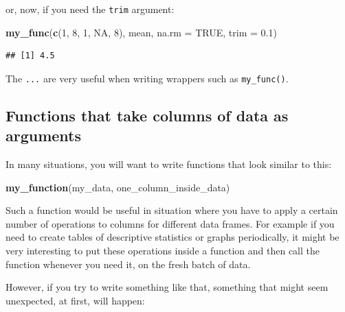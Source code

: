 \documentclass[]{gitbook}
\newenvironment{Shaded}{\begin{snugshade}}{\end{snugshade}}
\newcommand{\ControlFlowTok}[1]{\textcolor[rgb]{0.13,0.29,0.53}{\textbf{#1}}}
\newcommand{\DataTypeTok}[1]{\textcolor[rgb]{0.13,0.29,0.53}{#1}}
\newcommand{\DecValTok}[1]{\textcolor[rgb]{0.00,0.00,0.81}{#1}}
\newcommand{\FloatTok}[1]{\textcolor[rgb]{0.00,0.00,0.81}{#1}}
\newcommand{\KeywordTok}[1]{\textcolor[rgb]{0.13,0.29,0.53}{\textbf{#1}}}
\newcommand{\NormalTok}[1]{#1}
\newcommand{\OperatorTok}[1]{\textcolor[rgb]{0.81,0.36,0.00}{\textbf{#1}}}
\newcommand{\OtherTok}[1]{\textcolor[rgb]{0.56,0.35,0.01}{#1}}
\newcommand{\StringTok}[1]{\textcolor[rgb]{0.31,0.60,0.02}{#1}}
\begin{document}
or, now, if you need the \texttt{trim} argument:

\begin{Shaded}
\begin{Highlighting}[]
\KeywordTok{my_func}\NormalTok{(}\KeywordTok{c}\NormalTok{(}\DecValTok{1}\NormalTok{, }\DecValTok{8}\NormalTok{, }\DecValTok{1}\NormalTok{, }\OtherTok{NA}\NormalTok{, }\DecValTok{8}\NormalTok{), mean, }\DataTypeTok{na.rm =} \OtherTok{TRUE}\NormalTok{, }\DataTypeTok{trim =} \FloatTok{0.1}\NormalTok{)}
\end{Highlighting}
\end{Shaded}

\begin{verbatim}
## [1] 4.5
\end{verbatim}

The \texttt{...} are very useful when writing wrappers such as \texttt{my\_func()}.

\hypertarget{functions-that-take-columns-of-data-as-arguments}{%
\subsection{Functions that take columns of data as arguments}\label{functions-that-take-columns-of-data-as-arguments}}

In many situations, you will want to write functions that look similar to this:

\begin{Shaded}
\begin{Highlighting}[]
\KeywordTok{my_function}\NormalTok{(my_data, one_column_inside_data)}
\end{Highlighting}
\end{Shaded}

Such a function would be useful in situation where you have to apply a certain number of operations
to columns for different data frames. For example if you need to create tables of descriptive
statistics or graphs periodically, it might be very interesting to put these operations inside a
function and then call the function whenever you need it, on the fresh batch of data.

However, if you try to write something like that, something that might seem unexpected, at first,
will happen:

\begin{Shaded}
\end{Shaded}
\end{document}
